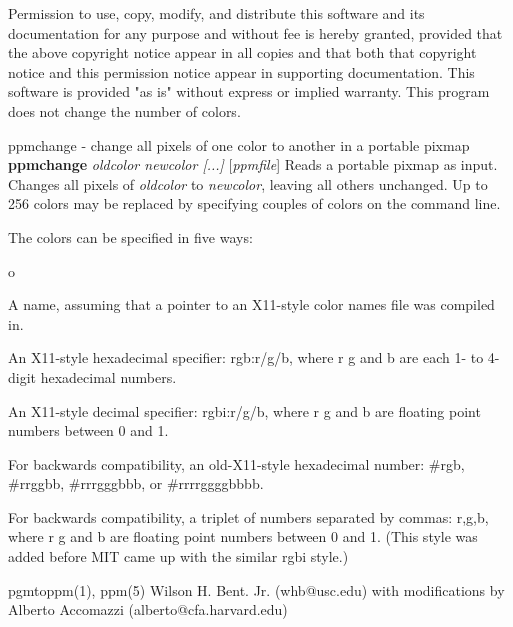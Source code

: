Permission to use, copy, modify, and distribute this software and its
documentation for any purpose and without fee is hereby granted, provided
that the above copyright notice appear in all copies and that both that
copyright notice and this permission notice appear in supporting
documentation.  This software is provided "as is" without express or
implied warranty.
This program does not change the number of colors.
%
 
%

\newpage
%

ppmchange - change all pixels of one color to another in a portable pixmap
{\bf ppmchange}
{\it oldcolor newcolor [...]}
{\rm [}{\it ppmfile}{\rm ]}
Reads a portable pixmap as input.
Changes all pixels of 
{\it oldcolor}
to 
{\it newcolor}{\rm ,}
leaving all others unchanged.
Up to 256 colors may be replaced by specifying couples of colors on
the command line.  
\par
The colors can be specified in five ways:
\begin{TPlist}{o}
\item[{o}]
A name, assuming
that a pointer to an X11-style color names file was compiled in.
\item[{o}]
An X11-style hexadecimal specifier: rgb:r/g/b, where r g and b are
each 1- to 4-digit hexadecimal numbers.
\item[{o}]
An X11-style decimal specifier: rgbi:r/g/b, where r g and b are
floating point numbers between 0 and 1.
\item[{o}]
For backwards compatibility, an old-X11-style hexadecimal
number: \#rgb, \#rrggbb, \#rrrgggbbb, or \#rrrrggggbbbb.
\item[{o}]
For backwards compatibility, a triplet of numbers
separated by commas: r,g,b, where r g and b are
floating point numbers between 0 and 1.
(This style was added before MIT came up with the similar rgbi style.)
\end{TPlist}
pgmtoppm(1), ppm(5)
Wilson H. Bent. Jr. (whb@usc.edu)
with modifications by Alberto Accomazzi (alberto@cfa.harvard.edu)
%

